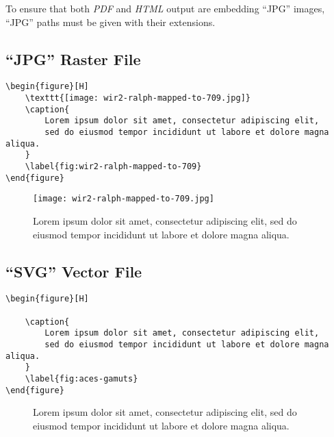 To ensure that both \textit{PDF} and \textit{HTML} output are embedding
``JPG'' images, ``JPG'' paths must be given with their extensions.

\subsection*{``JPG'' Raster File}

\begin{lstlisting}[caption={Embedding a ``JPG'' raster file.}]
\begin{figure}[H]
    \texttt{[image: wir2-ralph-mapped-to-709.jpg]}
    \caption{
        Lorem ipsum dolor sit amet, consectetur adipiscing elit,
        sed do eiusmod tempor incididunt ut labore et dolore magna aliqua.
    }
    \label{fig:wir2-ralph-mapped-to-709}
\end{figure}
\end{lstlisting}

\begin{figure}[H]
    \texttt{[image: wir2-ralph-mapped-to-709.jpg]}
    \caption{
        Lorem ipsum dolor sit amet, consectetur adipiscing elit,
        sed do eiusmod tempor incididunt ut labore et dolore magna aliqua.
    }
    \label{fig:wir2-ralph-mapped-to-709}
\end{figure}

\subsection*{``SVG'' Vector File}

\begin{lstlisting}[caption={Embedding a ``SVG'' vector file.}]
\begin{figure}[H]
    
    \caption{
        Lorem ipsum dolor sit amet, consectetur adipiscing elit,
        sed do eiusmod tempor incididunt ut labore et dolore magna aliqua.
    }
    \label{fig:aces-gamuts}
\end{figure}
\end{lstlisting}

\begin{figure}[H]
    
    \caption{
        Lorem ipsum dolor sit amet, consectetur adipiscing elit,
        sed do eiusmod tempor incididunt ut labore et dolore magna aliqua.
    }
    \label{fig:aces-gamuts}
\end{figure}

